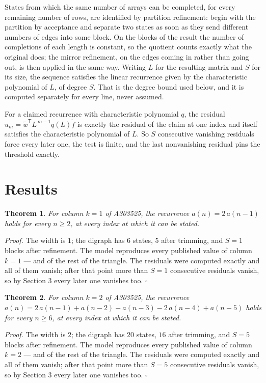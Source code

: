 \documentclass[11pt]{article}
\newtheorem{theorem}{Theorem}
\theoremstyle{definition}
\begin{document}
States from which the same number of arrays can be completed, for every remaining number of rows, are identified by partition refinement: begin with the partition by acceptance and separate two states as soon as they send different numbers of edges into some block. On the blocks of the result the number of completions of each length is constant, so the quotient counts exactly what the original does; the mirror refinement, on the edges coming in rather than going out, is then applied in the same way. Writing $L$ for the resulting matrix and $S$ for its size, the sequence satisfies the linear recurrence given by the characteristic polynomial of $L$, of degree $S$. That is the degree bound used below, and it is computed separately for every line, never assumed.

For a claimed recurrence with characteristic polynomial $q$, the residual $u_m = \tilde w^{\mathsf T}L^{\,m-1}q(L)\tilde f$ is exactly the residual of the claim at one index and itself satisfies the characteristic polynomial of $L$. So $S$ consecutive vanishing residuals force every later one, the test is finite, and the last nonvanishing residual pins the threshold exactly.

\section{Results}

\begin{theorem} For column $k = 1$ of A303525, the recurrence $a(n) = 2\,a(n-1)$ holds for every $n \ge 2$, at every index at which it can be stated.\end{theorem}

{\itshape Proof.} The width is $1$; the digraph has $6$ states, $5$ after trimming, and $S = 1$ blocks after refinement. The model reproduces every published value of column $k = 1$ --- and of the rest of the triangle. The residuals were computed exactly and all of them vanish; after that point more than $S = 1$ consecutive residuals vanish, so by Section 3 every later one vanishes too. $\square$

\begin{theorem} For column $k = 2$ of A303525, the recurrence $a(n) = 2\,a(n-1) + a(n-2) - a(n-3) - 2\,a(n-4) + a(n-5)$ holds for every $n \ge 6$, at every index at which it can be stated.\end{theorem}

{\itshape Proof.} The width is $2$; the digraph has $20$ states, $16$ after trimming, and $S = 5$ blocks after refinement. The model reproduces every published value of column $k = 2$ --- and of the rest of the triangle. The residuals were computed exactly and all of them vanish; after that point more than $S = 5$ consecutive residuals vanish, so by Section 3 every later one vanishes too. $\square$
\end{document}
